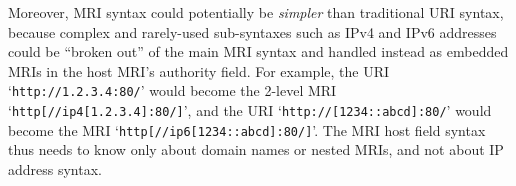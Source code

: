 Moreover, MRI syntax could potentially be \emph{simpler}
than traditional URI syntax,
because complex and rarely-used sub-syntaxes such as IPv4 and IPv6 addresses
could be ``broken out'' of the main MRI syntax
and handled instead as embedded MRIs in the host MRI's authority field.
For example,
the URI `\verb|http://1.2.3.4:80/|' would become
the 2-level MRI `\verb|http[//ip4[1.2.3.4]:80/]|', and
the URI `\verb|http://[1234::abcd]:80/|' would become
the MRI `\verb|http[//ip6[1234::abcd]:80/]|'.
The MRI host field syntax thus needs to know
only about domain names or nested MRIs,
and not about IP address syntax.
